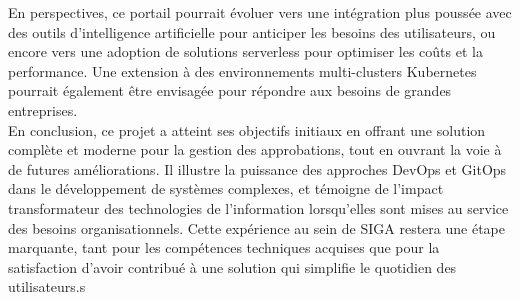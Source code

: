En perspectives, ce portail pourrait évoluer vers une intégration plus poussée avec des outils d’intelligence artificielle pour anticiper les besoins des utilisateurs, ou encore vers une adoption de solutions serverless pour optimiser les coûts et la performance. Une extension à des environnements multi-clusters Kubernetes pourrait également être envisagée pour répondre aux besoins de grandes entreprises.\\

En conclusion, ce projet a atteint ses objectifs initiaux en offrant une solution complète et moderne pour la gestion des approbations, tout en ouvrant la voie à de futures améliorations. Il illustre la puissance des approches DevOps et GitOps dans le développement de systèmes complexes, et témoigne de l’impact transformateur des technologies de l’information lorsqu’elles sont mises au service des besoins organisationnels. Cette expérience au sein de SIGA restera une étape marquante, tant pour les compétences techniques acquises que pour la satisfaction d’avoir contribué à une solution qui simplifie le quotidien des utilisateurs.s